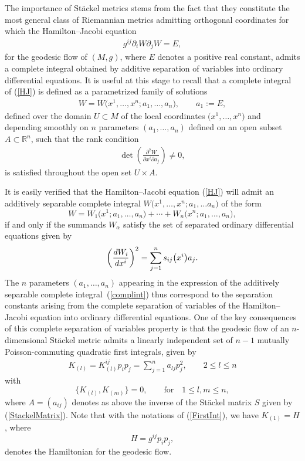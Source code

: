 \documentclass[11pt]{article}
\numberwithin{equation}{section}
\begin{document}
The importance of St\"ackel metrics stems from the fact that they constitute the most general class of Riemannian metrics admitting orthogonal coordinates for which the Hamilton--Jacobi equation
\begin{gather}\label{HJ}
g^{ij}\partial_{i}W\partial_{j}W=E,
\end{gather}
for the geodesic flow of $(M,g)$, where $E$ denotes a positive real constant, admits a complete integral obtained by additive separation of variables into ordinary differential equations. It is useful at this stage to recall that a complete integral of (\ref{HJ}) is defined as a parametrized family of solutions
\begin{gather}\label{complint}
W=W\big(x^{1},\dots,x^{n};a_{1},\dots,a_{n}\big),\qquad a_{1}:=E,
\end{gather}
defined over the domain $U\subset M$ of the local coordinates $\big(x^{1},\dots,x^{n}\big)$ and depending smoothly on $n$ parameters $(a_{1},\dots,a_{n})$ defined on an open subset $A\subset {\mathbb{R}}^{n}$, such that the rank condition
\begin{gather*}%
\det \left(\frac{\partial^{2}W}{\partial x^{i}\partial a_{j}}\right) \neq 0,
\end{gather*}
is satisfied throughout the open set $U\times A$.

It is easily verified that the Hamilton--Jacobi equation (\ref{HJ}) will admit an additively separable complete integral $W\big(x^{1},\dots, x^{n};a_{1},\dots a_{n}\big)$ of the form
\[
W=W_{1}\big(x^{1};a_{1},\dots, a_{n}\big)+\cdots+W_{n}\big(x^{n};a_{1},\dots, a_{n}\big),
\]
if and only if the summands $W_{\alpha}$ satisfy the set of separated ordinary differential equations given by
\[
\left(\frac{{\rm d}W_{i}}{{\rm d}x^{i}}\right)^{2}=\sum_{j=1}^{n}s_{ij}\big(x^{i}\big)a_{j}.
\]
The $n$ parameters $(a_{1},\dots , a_{n})$ appearing in the expression of the additively separable complete integral~(\ref{complint}) thus correspond to the separation constants arising from the complete separation of variables of the Hamilton--Jacobi equation into ordinary differential equations.
One of the key consequences of this complete separation of variables property is that the geodesic flow of an $n$-dimensional St\"ackel metric admits a linearly independent set of $n-1$ mutually Poisson-commuting quadratic first integrals, given by
\begin{gather}\label{FirstInt}
K_{(l)} = K_{(l)}^{ij} p_i p_j = \sum_{j=1}^{n}a_{lj} p_{j}^{2}, \qquad 2\leq l \leq n
\end{gather}
with
\[ \big\{K_{(l)},K_{(m)}\big\}=0,\qquad \text{for} \quad 1\leq l,m \leq n,
\]
where $A=(a_{ij})$ denotes as above the inverse of the St\"ackel matrix $S$ given by (\ref{StackelMatrix}). Note that with the notations of (\ref{FirstInt}), we have $K_{(1)}=H$, where
\[
H=g^{ij}p_{i}p_{j},
\]
denotes the Hamiltonian for the geodesic flow.
\end{document}
